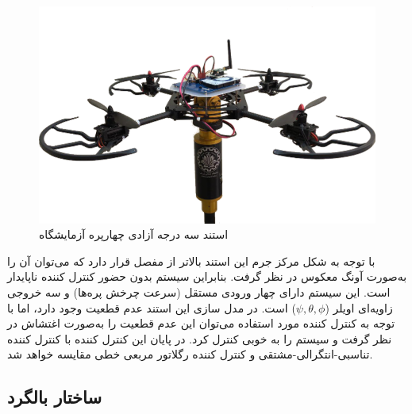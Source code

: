 \begin{figure}[H]\label{LabQuad}
	\includegraphics[width=12cm]{../../Figures/introduction/3DOFQuad.png}
	\centering
	\caption{استند سه درجه آزادی چهارپره آزمایشگاه 
	\cite{Iranlabexpo}}
\end{figure}
با توجه به شکل مرکز جرم این استند بالاتر از مفصل قرار دارد که می‌توان آن را به‌صورت آونگ معکوس در نظر گرفت. بنابراین سیستم بدون حضور کنترل کننده ناپایدار است. این سیستم دارای چهار ورودی مستقل (سرعت چرخش پره‌ها) و سه خروجی زاویه‌ای اویلر ($\psi, \theta, \phi$) است. در مدل سازی این استند عدم قطعیت وجود دارد، اما با توجه به کنترل کننده مورد استفاده می‌توان این عدم قطعیت را به‌صورت اغتشاش در نظر گرفت و سیستم را به خوبی کنترل کرد. در پایان این کنترل کننده با کنترل کننده تناسبی-انتگرالی-مشتقی 
و کنترل کننده رگلاتور مربعی خطی مقایسه خواهد ‌شد.


\subsection{ساختار بالگرد}

